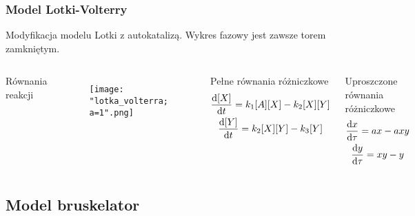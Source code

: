 \documentclass{beamer}
\begin{document}
\begin{frame}
\frametitle{Model Lotki-Volterry}
\small Modyfikacja modelu Lotki z autokatalizą. Wykres fazowy jest zawsze torem zamkniętym. \normalsize
\begin{columns}
\begin{block}{Równania reakcji}
\begin{center}
	 \\
	 \\
\end{center}
\end{block}
\begin{figure}
\texttt{[image: "lotka\_volterra; a=1".png]}
\end{figure}
\begin{block}{Pełne równania różniczkowe}
\begin{gather*}
	\dv{[X]}{t}=k_{1}[A][X]-k_{2}[X][Y] \\
	\dv{[Y]}{t}=k_{2}[X][Y]-k_{3}[Y]
\end{gather*}
\end{block}
\begin{block}{Uproszczone równania różniczkowe}
\begin{gather*}
	\dv{x}{\tau} = ax-axy \\
	\dv{y}{\tau} = xy-y
\end{gather*}
\end{block}
\end{columns}
\end{frame}

\subsection{Model bruskelator}
\end{document}
